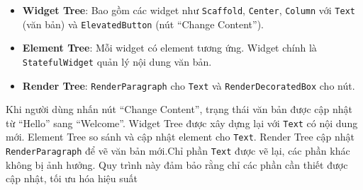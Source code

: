 \documentclass[../DoAn.tex]{subfiles}
\numberwithin{figure}{chapter}
\begin{document}
\begin{itemize}
    \item \textbf{Widget Tree}: Bao gồm các widget như \texttt{Scaffold}, \texttt{Center}, \texttt{Column} với \texttt{Text} (văn bản) và \texttt{ElevatedButton} (nút ``Change Content'').
    \item \textbf{Element Tree}: Mỗi widget có element tương ứng. Widget chính là \texttt{StatefulWidget} quản lý nội dung văn bản.
    \item \textbf{Render Tree}: \texttt{RenderParagraph} cho \texttt{Text} và \texttt{RenderDecoratedBox} cho nút.
\end{itemize}

Khi người dùng nhấn nút ``Change Content'', trạng thái văn bản được cập nhật từ ``Hello'' sang ``Welcome''. Widget Tree được xây dựng lại với \texttt{Text} có nội dung mới. Element Tree so sánh và cập nhật element cho \texttt{Text}. Render Tree cập nhật \texttt{RenderParagraph} để vẽ văn bản mới.Chỉ phần \texttt{Text} được vẽ lại, các phần khác không bị ảnh hưởng. Quy trình này đảm bảo rằng chỉ các phần cần thiết được cập nhật, tối ưu hóa hiệu suất
\end{document}
